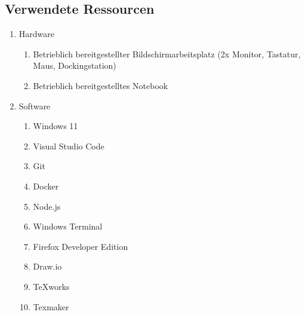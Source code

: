 \subsection{Verwendete Ressourcen}
\label{sec:Anhang:VerwendeteRessourcen}

\begin{enumerate}
    \item Hardware \\
    \begin{enumerate}
        \item Betrieblich bereitgestellter Bildschirmarbeitsplatz (2x Monitor, Tastatur, Maus, Dockingstation)
        \item Betrieblich bereitgestelltes Notebook
    \end{enumerate}
    \item Software \\
    \begin{enumerate}
        \item Windows 11
        \item Visual Studio Code
        \item Git
        \item Docker
        \item Node.js
        \item Windows Terminal
        \item Firefox Developer Edition
        \item Draw.io
        \item TeXworks
        \item Texmaker
    \end{enumerate}
\end{enumerate}
